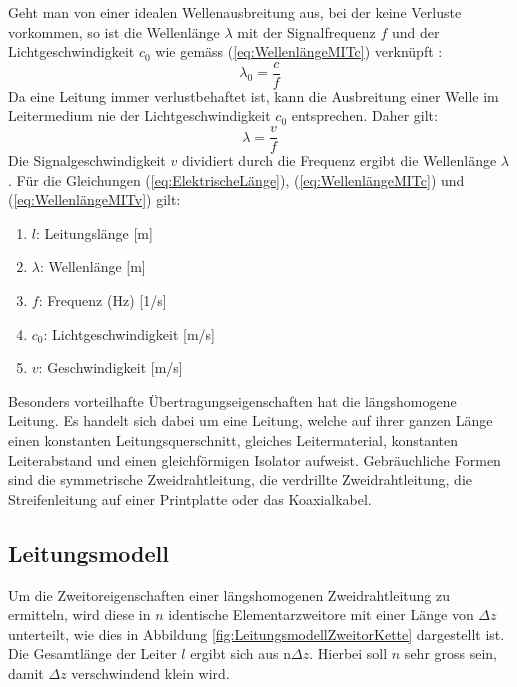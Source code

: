 Geht man von einer idealen Wellenausbreitung aus, bei der keine Verluste vorkommen, so ist die Wellenlänge $\lambda$ mit der Signalfrequenz $f$ und der Lichtgeschwindigkeit $c_0$ wie gemäss (\ref{eq:WellenlängeMITc}) verknüpft \cite{Tekom}:
\begin{equation}
\lambda_{0}=\dfrac{c}{f}\label{eq:WellenlängeMITc}
\end{equation}
Da eine Leitung immer verlustbehaftet ist, kann die Ausbreitung einer Welle im Leitermedium nie der Lichtgeschwindigkeit $c_0$ entsprechen. Daher gilt:
\begin{equation}
\lambda=\dfrac{v}{f}\label{eq:WellenlängeMITv}
\end{equation}
Die Signalgeschwindigkeit $v$ dividiert durch die Frequenz ergibt die Wellenlänge $\lambda$. Für die Gleichungen (\ref{eq:ElektrischeLänge}), (\ref{eq:WellenlängeMITc}) und (\ref{eq:WellenlängeMITv}) gilt:
\begin{enumerate}[leftmargin=2cm]
   \item[] $l$: Leitungslänge [m] 
   \item[] $\lambda$: Wellenlänge  [m] 
   \item[] $f$: Frequenz (Hz) [1/s] 
   \item[] $c_0$: Lichtgeschwindigkeit  [m/s] 
   \item[] $v$: Geschwindigkeit  [m/s] 
\end{enumerate} 
Besonders vorteilhafte Übertragungseigenschaften hat die längshomogene Leitung. Es handelt sich dabei um eine Leitung, welche auf ihrer ganzen Länge einen konstanten Leitungsquerschnitt, gleiches
Leitermaterial, konstanten Leiterabstand und einen gleichförmigen Isolator aufweist. Gebräuchliche Formen sind die symmetrische Zweidrahtleitung, die verdrillte Zweidrahtleitung, die Streifenleitung auf einer Printplatte oder das Koaxialkabel.
\subsection{Leitungsmodell}
Um die Zweitoreigenschaften einer längshomogenen Zweidrahtleitung zu ermitteln, wird diese in $n$ identische Elementarzweitore mit einer Länge von $\Delta z$ unterteilt, wie dies in Abbildung \ref{fig:LeitungsmodellZweitorKette} dargestellt ist. Die Gesamtlänge der Leiter $l$ ergibt sich aus n$\Delta z$. Hierbei soll $n$ sehr gross sein, damit $\Delta z$ verschwindend klein wird.

